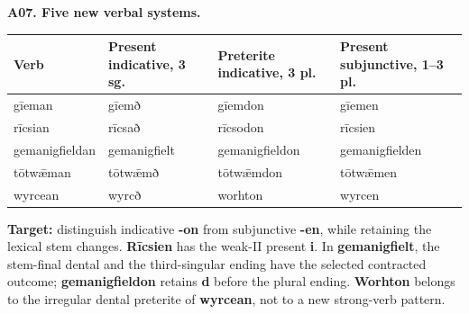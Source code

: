 \par\begin{minipage}{\linewidth}\raggedright
\textbf{A07. Five new verbal systems.}

\par\begingroup
\fontsize{10.5}{13.2}\selectfont
\setlength{\LTleft}{0pt}\setlength{\LTright}{\fill}
\noindent
\begin{tabular}{@{}>{\raggedright\arraybackslash}p{25.0mm}>{\raggedright\arraybackslash}p{27.5mm}>{\raggedright\arraybackslash}p{31.0mm}>{\raggedright\arraybackslash}p{32.064mm}@{}}
\toprule
\textbf{Verb} & \textbf{Present indicative, 3 sg.} & \textbf{Preterite indicative, 3 pl.} & \textbf{Present subjunctive, 1–3 pl.} \\
\midrule
gīeman & gīemð & gīemdon & gīemen \\
rīcsian & rīcsað & rīcsodon & rīcsien \\
gemanigfieldan & gemanigfielt & gemanigfieldon & gemanigfielden \\
tōtwǣman & tōtwǣmð & tōtwǣmdon & tōtwǣmen \\
wyrcean & wyrcð & worhton & wyrcen \\
\bottomrule
\end{tabular}
\par\endgroup
\textbf{Target:} distinguish indicative \textbf{-on} from subjunctive \textbf{-en}, while retaining the lexical stem changes. \textbf{Rīcsien} has the weak-II present \textbf{i}. In \textbf{gemanigfielt}, the stem-final dental and the third-singular ending have the selected contracted outcome; \textbf{gemanigfieldon} retains \textbf{d} before the plural ending. \textbf{Worhton} belongs to the irregular dental preterite of \textbf{wyrcean}, not to a new strong-verb pattern.

\end{minipage}\par\addvspace{4pt}


